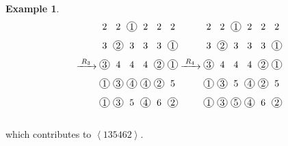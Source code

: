 \documentclass[reqno]{amsart}
\newcommand{\0}{\phantom{c}}
\newcommand{\swt}[1]{\left\langle #1 \right\rangle} %
\theoremstyle{plain}
\theoremstyle{definition}
\newtheorem{example}[thm]{Example}
\numberwithin{equation}{section}
\begin{document}
\begin{example}
\[\begin{tikzpicture}[xscale=0.5,yscale=0.7,every node/.style={inner sep=0.8pt},baseline=55]
\end{tikzpicture}
\xrightarrow[\hspace{15pt}]{R_3}
\begin{tikzpicture}[xscale=0.5,yscale=0.7,every node/.style={inner sep=0.8pt},baseline=55]
\node at (0, 5){2};\node at (1, 5){2};\node[circle, draw=black] at (2, 5){1};\node at (3, 5){2};\node at (4, 5){2};\node at (5, 5){2};\node at (0, 4){3};\node[circle, draw=black] at (1, 4){2};\node at (2, 4){3};\node at (3, 4){3};\node at (4, 4){3};\node[circle, draw=black] at (5, 4){1};\node[circle, draw=black] at (0, 3){3};\node at (1, 3){4};\node at (2, 3){4};\node at (3, 3){4};\node[circle, draw=black] at (4, 3){2};\node[circle, draw=black] at (5, 3){1};\node[circle, draw=black] at (0, 2){1};\node[circle, draw=black] at (1, 2){3};\node[circle, draw=black] at (2, 2){4};\node[circle, draw=black] at (3, 2){4};\node[circle, draw=black] at (4, 2){2};\node at (5, 2){5};\node[circle, draw=black] at (0, 1){1};\node[circle, draw=black] at (1, 1){3};\node at (2, 1){5};\node[circle, draw=black] at (3, 1){4};\node at (4, 1){6};\node[circle, draw=black] at (5, 1){2};\end{tikzpicture}
\xrightarrow[\hspace{15pt}]{R_4}
\begin{tikzpicture}[xscale=0.5,yscale=0.7,every node/.style={inner sep=0.8pt},baseline=55]
\node at (0, 5){2};\node at (1, 5){2};\node[circle, draw=black] at (2, 5){1};\node at (3, 5){2};\node at (4, 5){2};\node at (5, 5){2};\node at (0, 4){3};\node[circle, draw=black] at (1, 4){2};\node at (2, 4){3};\node at (3, 4){3};\node at (4, 4){3};\node[circle, draw=black] at (5, 4){1};\node[circle, draw=black] at (0, 3){3};\node at (1, 3){4};\node at (2, 3){4};\node at (3, 3){4};\node[circle, draw=black] at (4, 3){2};\node[circle, draw=black] at (5, 3){1};\node[circle, draw=black] at (0, 2){1};\node[circle, draw=black] at (1, 2){3};\node at (2, 2){5};\node[circle, draw=black] at (3, 2){4};\node[circle, draw=black] at (4, 2){2};\node at (5, 2){5};\node[circle, draw=black] at (0, 1){1};\node[circle, draw=black] at (1, 1){3};\node[circle, draw=black] at (2, 1){5};\node[circle, draw=black] at (3, 1){4};\node at (4, 1){6};\node[circle, draw=black] at (5, 1){2};
\end{tikzpicture}
\]
which contributes to $\swt{135462}$.
\end{example}
\end{document}
